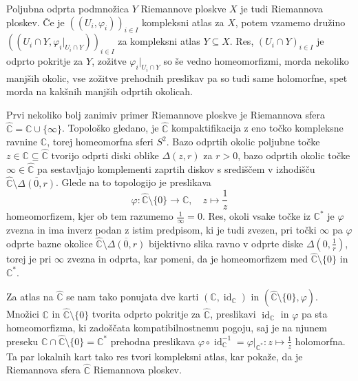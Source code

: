 \documentclass[mat1]{fmfdelo}
\numberwithin{equation}{section}
\newcommand{\C}{\mathbb C}
\newcommand{\CM}{\mathbb C ^*}
\newcommand{\RS}{\widehat{\C}}
\newcommand{\inv}{^{-1}}
\newcommand{\disk}[2]{\Delta(#1, #2)}
\DeclareMathOperator{\id}{id}
\theoremstyle{definition}
\begin{document}
\begin{primer*}
    
    Poljubna odprta podmnožica $Y$ Riemannove ploskve $X$ je tudi Riemannova ploskev. Če je $((U_i, \varphi_i))_{i \in I}$ kompleksni atlas za $X$, potem vzamemo družino $((U_i \cap Y, \varphi_i|_{U_i \cap Y}))_{i \in I}$ za kompleksni atlas $Y\subseteq X$. Res, $(U_i \cap Y)_{i \in I}$ je odprto pokritje za $Y$, zožitve $\varphi_i|_{U_i \cap Y}$ so še vedno homeomorfizmi, morda nekoliko manjših okolic, vse zožitve prehodnih preslikav pa so tudi same holomorfne, spet morda na kakšnih manjših odprtih okolicah. 
\end{primer*}
    
\begin{primer*}
    Prvi nekoliko bolj zanimiv primer Riemannove ploskve je Riemannova sfera $\RS = \C \cup \{\infty\}$. Topološko gledano, je $\RS$ kompaktifikacija z eno točko kompleksne ravnine $\C$, torej homeomorfna sferi $S^2$. Bazo odprtih okolic poljubne točke $z \in \C \subseteq \RS$ tvorijo odprti diski oblike $\disk{z}{r}$ za $r>0$, bazo odprtih okolic točke $\infty \in \RS$ pa sestavljajo komplementi zaprtih diskov s središčem v izhodišču $\RS \setminus \overline{\disk{0}{r}}$. Glede na to topologijo je preslikava
    \[
        \varphi: \RS\setminus\{0\} \to \C, \quad z \mapsto \frac{1}{z}
    \]
    homeomorfizem, kjer ob tem razumemo $\frac{1}{\infty} = 0$. Res, okoli vsake točke iz $\CM$ je $\varphi$ zvezna in ima inverz podan z istim predpisom, ki je tudi zvezen, pri točki $\infty$ pa $\varphi$ odprte bazne okolice $\RS \setminus \overline{\disk{0}{r}}$ bijektivno slika ravno v odprte diske $\disk{0}{\frac{1}{r}}$, torej je pri $\infty$ zvezna in odprta, kar pomeni, da je homeomorfizem med $\RS\setminus\{0\}$ in $\CM$.
    
    Za atlas na $\RS$ se nam tako ponujata dve karti $(\C, \id_\C)$ in $(\RS\setminus\{0\}, \varphi)$. Množici $\C$ in $\RS\setminus\{0\}$ tvorita odprto pokritje za $\RS$, preslikavi $\id_\C$ in $\varphi$ pa sta homeomorfizma, ki zadoščata kompatibilnostnemu pogoju, saj je na njunem preseku $\C \cap \RS\setminus\{0\} = \CM$ prehodna preslikava $\varphi \circ \id_\C\inv = \varphi|_{\CM} : z \mapsto \frac{1}{z}$ holomorfna. Ta par lokalnih kart tako res tvori kompleksni atlas, kar pokaže, da je Riemannova sfera $\RS$ Riemannova ploskev.
\end{primer*}
\end{document}
